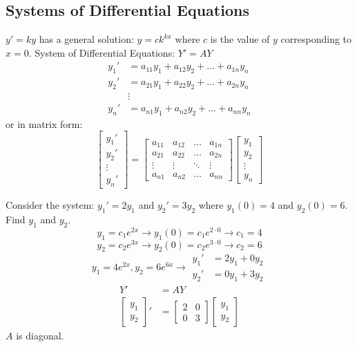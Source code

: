 \documentclass[12pt]{article}
\begin{document}
\subsection{Systems of Differential Equations} 
$y' = ky$ has a general solution: $ y = ck^{kx} $ where $c$ is the value of $y$ corresponding to $x = 0$. \newline System of Differential Equations: $Y' = AY$ 
$$\begin{aligned} y_1' &= a_{11}y_1 + a_{12}y_2 + \dots + a_{1n}y_n \\ y_2' &= a_{21}y_1 + a_{22}y_2 + \dots + a_{2n}y_n \\ &\vdots \\ y_n' &= a_{n1}y_1 + a_{n2}y_2 + \dots + a_{nn}y_n \end{aligned} $$ or in matrix form: $$ \begin{bmatrix} y_1' \\ y_2' \\ \vdots \\ y_n' \end{bmatrix} = \begin{bmatrix}  a_{11} & a_{12} & \dots & a_{1n} \\ a_{21} & a_{22} & \dots & a_{2n} \\ \vdots & \vdots & \ddots & \vdots \\ a_{n1} & a_{n2} & \dots & a_{nn} \end{bmatrix}\begin{bmatrix} y_1 \\ y_2 \\ \vdots \\ y_n \end{bmatrix} $$ 
\begin{example} Consider the system: $y_1' = 2y_1$ and $y_2' = 3y_2$ where $y_1(0) = 4$ and $y_2(0) = 6$. Find $y_1$ and $y_2$. 
$$ y_1 = c_1e^{2x} \rightarrow y_1(0) = c_1e^{2\cdot0} \rightarrow c_1 = 4$$ $$y_2 = c_2e^{3x} \rightarrow y_2(0) = c_2e^{3\cdot0} \rightarrow c_2 = 6$$ 
$$y_1 = 4e^{2x}, y_2 = 6e^{6x} \rightarrow \begin{aligned} y_1' &= 2y_1 + 0y_2 \\ y_2' &= 0y_1 + 3y_2 \end{aligned} $$ 
$$\begin{aligned} Y' &= AY \\ \begin{bmatrix} y_1 \\ y_2 \end{bmatrix}' &= \begin{bmatrix} 2 & 0 \\ 0 & 3 \end{bmatrix}\begin{bmatrix} y_1 \\ y_2 \end{bmatrix}\end{aligned} $$ 
$A$ is diagonal. \end{example} 
\end{document}
